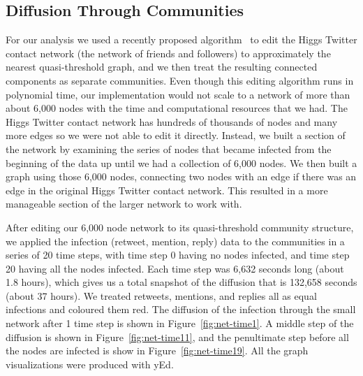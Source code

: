 \documentclass[12pt, oneside, openany]{article} %
\begin{document}
\subsection{Diffusion Through Communities}
For our analysis we used a recently proposed algorithm~\cite{brandes} to edit the Higgs Twitter contact network (the network of friends and followers) to approximately the nearest quasi-threshold graph, and we then treat the resulting connected components as separate communities. Even though this editing algorithm runs in polynomial time, our implementation would not scale to a network of more than about 6,000 nodes with the time and computational resources that we had. The Higgs Twitter contact network has hundreds of thousands of nodes and many more edges so we were not able to edit it directly. Instead, we built a section of the network by examining the series of nodes that became infected from the beginning of the data up until we had a collection of 6,000 nodes. We then built a graph using those 6,000 nodes, connecting two nodes with an edge if there was an edge in the original Higgs Twitter contact network. This resulted in a more manageable section of the larger network to work with.

After editing our 6,000 node network to its quasi-threshold community structure, we applied the infection (retweet, mention, reply) data to the communities in a series of 20 time steps, with time step 0 having no nodes infected, and time step 20 having all the nodes infected. Each time step was 6,632 seconds long (about 1.8 hours), which gives us a total snapshot of the diffusion that is 132,658 seconds (about 37 hours). We treated retweets, mentions, and replies all as equal infections and coloured them red. The diffusion of the infection through the small network after 1 time step is shown in Figure~\ref{fig:net-time1}. A middle step of the diffusion is shown in Figure~\ref{fig:net-time11}, and the penultimate step before all the nodes are infected is show in Figure~\ref{fig:net-time19}. All the graph visualizations were produced with yEd.
\end{document}
